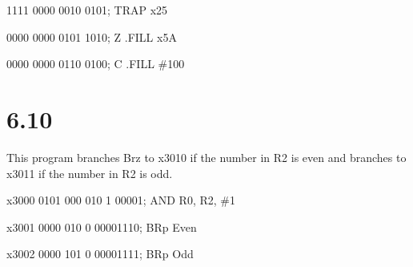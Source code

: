 \documentclass[20pt]{ctexart}
\begin{document}
1111 0000 0010 0101; TRAP x25 

0000 0000 0101 1010; Z .FILL x5A 

0000 0000 0110 0100; C .FILL \#100 


\section*{6.10}
This program branches Brz to x3010 if the number in R2 is even and branches to x3011 if the number in R2 is odd.

x3000 0101 000 010 1 00001; AND R0, R2, \#1 

x3001 0000 010 0 00001110; BRp Even 

x3002 0000 101 0 00001111; BRp Odd 


\end{document}
